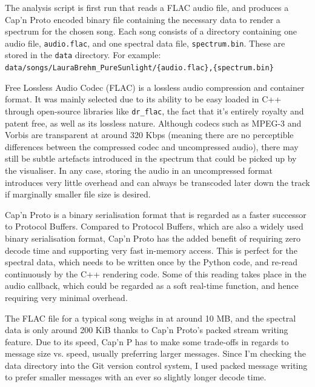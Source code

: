 \documentclass[11pt]{article}
\begin{document}
The analysis script is first run that reads a FLAC \cite{xiphFLACWhat} audio file, and produces a Cap'n Proto
\cite{capnp} encoded binary file containing the necessary data to render a spectrum for the chosen song. Each
song consists of a directory containing one audio file, \verb|audio.flac|, and one spectral data file,
\verb|spectrum.bin|. These are stored in the \verb|data| directory. For example: \\
\verb|data/songs/LauraBrehm_PureSunlight/{audio.flac},{spectrum.bin}|

Free Lossless Audio Codec (FLAC) \cite{xiphFLACWhat} is a lossless audio compression and container format. It was mainly selected
due to its ability to be easy loaded in C++ through open-source libraries like \verb|dr_flac|, the fact that
it's entirely royalty and patent free, as well as its lossless nature. Although codecs such as MPEG-3 and
Vorbis are transparent at around 320 Kbps (meaning there are no perceptible differences between the compressed
codec and uncompressed audio), there may still be subtle artefacts introduced in the spectrum that could be
picked up by the visualiser. In any case, storing the audio in an uncompressed format introduces very little
overhead and can always be transcoded later down the track if marginally smaller file size is desired.

Cap'n Proto \cite{capnp} is a binary serialisation format that is regarded as a faster successor to Protocol Buffers.
Compared to Protocol Buffers, which are also a widely used binary serialisation format, Cap'n Proto has the
added benefit of requiring zero decode time and supporting very fast in-memory access. This is perfect for the
spectral data, which needs to be written once by the Python code, and re-read continuously by the C++
rendering code. Some of this reading takes place in the audio callback, which could be regarded as a soft
real-time function, and hence requiring very minimal overhead.

The FLAC file for a typical song weighs in at around 10 MB, and the spectral data is only around 200 KiB
thanks to Cap'n Proto's packed stream writing feature. Due to its speed, Cap'n P has to make some
trade-offs in regards to message size vs. speed, usually preferring larger messages. Since I'm checking the
data directory into the Git version control system, I used packed message writing to prefer smaller messages
with an ever so slightly longer decode time.
\end{document}
